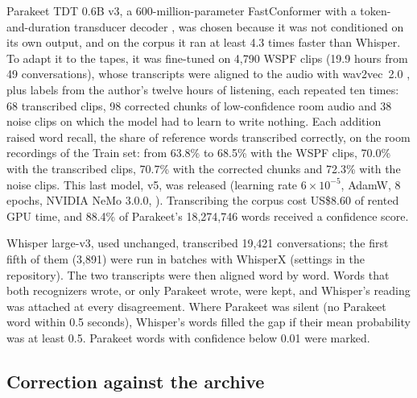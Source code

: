  Parakeet TDT 0.6B v3, a 600-million-parameter FastConformer with a token-and-duration transducer decoder \citep{xu2023tdt,nvidia2025parakeetv3}, was chosen because it was not conditioned on its own output, and on the corpus it ran at least 4.3 times faster than Whisper. To adapt it to the tapes, it was fine-tuned on 4,790 WSPF clips (19.9 hours from 49 conversations), whose transcripts were aligned to the audio with wav2vec~2.0 \citep{baevski2020wav2vec2}, plus labels from the author's twelve hours of listening, each repeated ten times: 68 transcribed clips, 98 corrected chunks of low-confidence room audio and 38 noise clips on which the model had to learn to write nothing. Each addition raised word recall, the share of reference words transcribed correctly, on the room recordings of the Train set: from 63.8\% to 68.5\% with the WSPF clips, 70.0\% with the transcribed clips, 70.7\% with the corrected chunks and 72.3\% with the noise clips. This last model, v5, was released (learning rate $6\times10^{-5}$, AdamW, 8 epochs, NVIDIA NeMo 3.0.0, \citealp{kuchaiev2019nemo}). Transcribing the corpus cost US\$8.60 of rented GPU time, and 88.4\% of Parakeet's 18,274,746 words received a confidence score.

 Whisper large-v3, used unchanged, transcribed 19,421 conversations; the first fifth of them (3,891) were run in batches with WhisperX (settings in the repository). The two transcripts were then aligned word by word. Words that both recognizers wrote, or only Parakeet wrote, were kept, and Whisper's reading was attached at every disagreement. Where Parakeet was silent (no Parakeet word within 0.5 seconds), Whisper's words filled the gap if their mean probability was at least 0.5. Parakeet words with confidence below 0.01 were marked.

\subsection{Correction against the archive}
\label{sec:correct}

